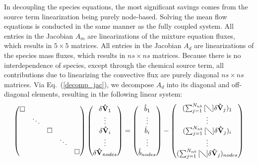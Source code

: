In decoupling the species equations, the most significant savings comes from the
source term linearization being purely node-based\cite{gnoffo-tp}.  Solving the
mean flow equations is conducted in the same manner as the fully coupled system.
All entries in the Jacobian $A_m$ are linearizations of the mixture equation
fluxes, which results in $5\times5$ matrices. All entries in the Jacobian $A_d$
are linearizations of the species mass fluxes, which results in $ns \times ns$
matrices.  Because there is no interdependence of species, except through the
chemical source term, all contributions due to linearizing the convective flux
are purely diagonal $ns \times ns$ matrices.  Via Eq.~(\ref{decomp_jac}), we
decompose $A_d$ into its diagonal and off-diagonal elements, resulting in the
following linear system:
\begin{equation}
  \label{dc_sys} 
  \begin{pmatrix} 
    \Box & & & & \\ & \ddots & & & \\ & & \Box \\ & & & \ddots & \\ & & & & \Box
  \end{pmatrix}
  \begin{pmatrix}
    \delta \mathbf{\hat{V}}_1 \\ \vdots \\ \delta \mathbf{\hat{V}}_i \\ 
    \vdots \\ \delta \mathbf{\hat{V}}_{nodes}
  \end{pmatrix}
  =
  \begin{pmatrix}
    \hat{b}_1 \\ \vdots \\ \hat{b}_i \\ \vdots \\ \hat{b}_{nodes} 
  \end{pmatrix}
  -
  \begin{pmatrix}
    (\sum_{j=1}^{N_{nb}}{[\diagdown] \delta\mathbf{\hat{V}}_{j}})_1 \\ \vdots \\
    (\sum_{j=1}^{N_{nb}}{[\diagdown] \delta\mathbf{\hat{V}}_{j}})_i \\ \vdots \\
    (\sum_{j=1}^{N_{nb}}{[\diagdown] \delta\mathbf{\hat{V}}_{j}})_{nodes}
  \end{pmatrix} 
\end{equation} 
